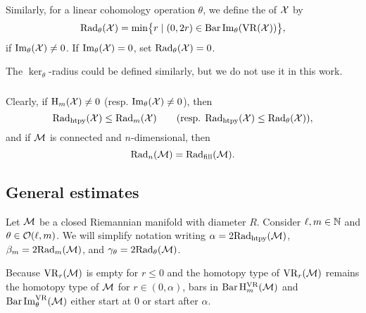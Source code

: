 Similarly, for a linear cohomology operation \(\theta\), we define the  of \(\cX\) by
\[
\firstdeath{\theta}{\cX} = \min\set[\big]{r \mid (0, 2r) \in \barc \img_\theta(\VR(\cX))},
\]
if \(\img_\theta(\cX) \neq 0\). 
If \(\img_\theta(\cX) = 0\), set $\firstdeath{\theta}{\cX} = 0$.

The \(\ker_\theta\)-radius could be defined similarly, but we do not use it in this work.


\subsubsection{}
\label{ss:beta v.s. fillrad}

Clearly, if \(\rH_m(\cX) \neq 0\) (resp. \(\img_\theta(\cX) \neq 0\)), then
\[
    \crit(\cX) \leq \firstdeath{m}{\cX} \qquad (\text{resp. }\crit(\cX) \leq  \firstdeath{\theta}{\cX}),
\]
and if $\cM$ is connected and $n$-dimensional, then
\[\firstdeath{n}{\cM} = \fillrad(\cM).\]


%


\subsection{General estimates}\label{ss:barcode_general}

Let \(\cM\) be a closed Riemannian manifold with diameter \(R\).
Consider \(\ell, \degp \in \N\) and \(\theta \in \cO(\ell,\degp)\).
We will simplify notation writing \(\alpha = 2\crit(\cM)\), \(\beta_m = 2\firstdeath{\degp}{\cM}\), and \(\gamma_\theta = 2\firstdeath{\theta}{\cM}\).

Because $\VR_r(\cM)$ is empty for \(r \leq 0\) and the homotopy type of $\VR_r(\cM)$ remains the homotopy type of $\cM$ for $r \in (0, \alpha)$, bars in \(\barc \rH_\degp^{\VR}(\cM)\) and $\barc\img_\theta^{\VR}(\cM)$ either start at $0$ or start after $\alpha$.

